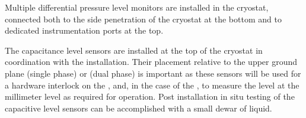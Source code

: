 % 
% 

Multiple differential pressure level monitors are installed in the
cryostat, connected both to the side
penetration of the cryostat at the bottom and to dedicated
instrumentation ports at the top.

The capacitance level sensors are installed at the top of the
cryostat in coordination with the  installation.  Their
placement relative to the upper ground plane (single phase) or
 (dual phase) is important as these sensors will be used for a
hardware interlock on the , and, in the case of the , to measure the \lar level at the millimeter level as required
for \dual operation.
Post installation in situ testing of the capacitive level sensors can be
accomplished with a small dewar of liquid.


